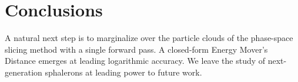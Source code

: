 \section{Conclusions}\label{sec:conclusions}

A natural next step is to marginalize over the particle clouds of the
phase-space slicing method with a single forward pass. A closed-form
Energy Mover's Distance emerges at leading logarithmic accuracy. We
leave the study of next-generation sphalerons at leading power to future
work.

